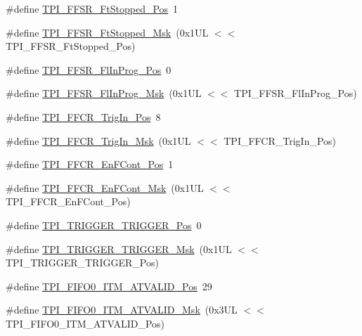 \begin{DoxyCompactItemize}
\#define \hyperlink{group___c_m_s_i_s___t_p_i_gaedf31fd453a878021b542b644e2869d2}{T\+P\+I\+\_\+\+F\+F\+S\+R\+\_\+\+Ft\+Stopped\+\_\+\+Pos}~1
\item 
\#define \hyperlink{group___c_m_s_i_s___t_p_i_ga1ab6c3abe1cf6311ee07e7c479ce5f78}{T\+P\+I\+\_\+\+F\+F\+S\+R\+\_\+\+Ft\+Stopped\+\_\+\+Msk}~(0x1\+U\+L $<$$<$ T\+P\+I\+\_\+\+F\+F\+S\+R\+\_\+\+Ft\+Stopped\+\_\+\+Pos)
\item 
\#define \hyperlink{group___c_m_s_i_s___t_p_i_ga542ca74a081588273e6d5275ba5da6bf}{T\+P\+I\+\_\+\+F\+F\+S\+R\+\_\+\+Fl\+In\+Prog\+\_\+\+Pos}~0
\item 
\#define \hyperlink{group___c_m_s_i_s___t_p_i_ga63dfb09259893958962914fc3a9e3824}{T\+P\+I\+\_\+\+F\+F\+S\+R\+\_\+\+Fl\+In\+Prog\+\_\+\+Msk}~(0x1\+U\+L $<$$<$ T\+P\+I\+\_\+\+F\+F\+S\+R\+\_\+\+Fl\+In\+Prog\+\_\+\+Pos)
\item 
\#define \hyperlink{group___c_m_s_i_s___t_p_i_gaa7ea11ba6ea75b541cd82e185c725b5b}{T\+P\+I\+\_\+\+F\+F\+C\+R\+\_\+\+Trig\+In\+\_\+\+Pos}~8
\item 
\#define \hyperlink{group___c_m_s_i_s___t_p_i_ga360b413bc5da61f751546a7133c3e4dd}{T\+P\+I\+\_\+\+F\+F\+C\+R\+\_\+\+Trig\+In\+\_\+\+Msk}~(0x1\+U\+L $<$$<$ T\+P\+I\+\_\+\+F\+F\+C\+R\+\_\+\+Trig\+In\+\_\+\+Pos)
\item 
\#define \hyperlink{group___c_m_s_i_s___t_p_i_ga99e58a0960b275a773b245e2b69b9a64}{T\+P\+I\+\_\+\+F\+F\+C\+R\+\_\+\+En\+F\+Cont\+\_\+\+Pos}~1
\item 
\#define \hyperlink{group___c_m_s_i_s___t_p_i_ga27d1ecf2e0ff496df03457a2a97cb2c9}{T\+P\+I\+\_\+\+F\+F\+C\+R\+\_\+\+En\+F\+Cont\+\_\+\+Msk}~(0x1\+U\+L $<$$<$ T\+P\+I\+\_\+\+F\+F\+C\+R\+\_\+\+En\+F\+Cont\+\_\+\+Pos)
\item 
\#define \hyperlink{group___c_m_s_i_s___t_p_i_ga5517fa2ced64efbbd413720329c50b99}{T\+P\+I\+\_\+\+T\+R\+I\+G\+G\+E\+R\+\_\+\+T\+R\+I\+G\+G\+E\+R\+\_\+\+Pos}~0
\item 
\#define \hyperlink{group___c_m_s_i_s___t_p_i_ga814227af2b2665a0687bb49345e21110}{T\+P\+I\+\_\+\+T\+R\+I\+G\+G\+E\+R\+\_\+\+T\+R\+I\+G\+G\+E\+R\+\_\+\+Msk}~(0x1\+U\+L $<$$<$ T\+P\+I\+\_\+\+T\+R\+I\+G\+G\+E\+R\+\_\+\+T\+R\+I\+G\+G\+E\+R\+\_\+\+Pos)
\item 
\#define \hyperlink{group___c_m_s_i_s___t_p_i_gaa7e050e9eb6528241ebc6835783b6bae}{T\+P\+I\+\_\+\+F\+I\+F\+O0\+\_\+\+I\+T\+M\+\_\+\+A\+T\+V\+A\+L\+I\+D\+\_\+\+Pos}~29
\item 
\#define \hyperlink{group___c_m_s_i_s___t_p_i_ga94cb2493ed35d2dab7bd4092b88a05bc}{T\+P\+I\+\_\+\+F\+I\+F\+O0\+\_\+\+I\+T\+M\+\_\+\+A\+T\+V\+A\+L\+I\+D\+\_\+\+Msk}~(0x3\+U\+L $<$$<$ T\+P\+I\+\_\+\+F\+I\+F\+O0\+\_\+\+I\+T\+M\+\_\+\+A\+T\+V\+A\+L\+I\+D\+\_\+\+Pos)

\end{DoxyCompactItemize}
